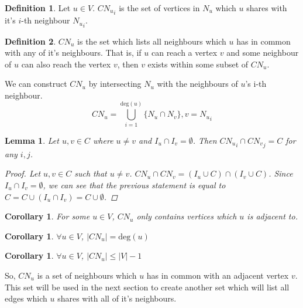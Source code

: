 \documentclass{article}
\theoremstyle{plain}
\newtheorem{lem}[thm]{Lemma}
\newtheorem{cor}[thm]{Corollary}
\theoremstyle{definition}
\newtheorem{defn}{Definition}[]
\theoremstyle{remark}
\newcommand{\cn}[1]{ {{CN}_{#1}} }
\newcommand{\vdeg}[1]{ {\text{deg}({#1})} }
\newcommand{\ignv}[1]{ {I_{#1}} }
\newcommand{\nev}[1]{ {N_{#1}} }
\begin{document}
\begin{defn}
    Let \(u \in V\). \(\cn{u}_i\) is the set of vertices in \(\nev{u}\) which \(u\) shares
    with it's \(i\)-th neighbour \(\nev{u}_i\).
\end{defn}

\begin{defn}
    \(\cn{u}\) is the set which lists all neighbours which \(u\) has in common with any of
    it's neighbours. That is, if \(u\) can reach a vertex \(v\) and some neighbour of
    \(u\) can also reach the vertex \(v\), then \(v\) exists within some subset of
    \(\cn{u}\).
\end{defn}

We can construct \(\cn{u}\) by intersecting \(\nev{u}\) with the neighbours of \(u\)'s
i-th neighbour.
\begin{equation}
    \cn{u} = \bigcup_{i=1}^{\vdeg{u}} \{ \nev{u} \cap \nev{v} \}, v = {\nev{u}}_i
    \label{cn_construct}
\end{equation}

\begin{lem}
    Let \(u, v \in C\) where \(u \neq v\) and \(\ignv{u} \cap \ignv{v} = \emptyset\). Then
    \(\cn{u}_i \cap \cn{v}_j = C\) for any \(i, j\).
    \label{cn_no_common}
    \begin{proof}
        Let \(u, v \in C\) such that \(u \neq v\).
        \(\cn{u} \cap \cn{v} = (\ignv{u} \cup C) \cap (\ignv{v} \cup C)\). Since
        \(\ignv{u} \cap \ignv{v} = \emptyset\), we can see that the previous statement is
        equal to \(C = C \cup (\ignv{u} \cap \ignv{v}) = C \cup \emptyset\).
    \end{proof}
\end{lem}

\begin{cor}
    For some \(u \in V\), \(\cn{u}\) only contains vertices which \(u\) is adjacent to.
    \label{cn_exclusive_neighbours}
\end{cor}

\begin{cor}
    \(\forall u \in V\), \(|\cn{u}| = \vdeg{u}\)
\end{cor}
\begin{cor}
    \(\forall u \in V\), \(|\cn{u}| \leq |V| - 1\)
    \label{max_cn}
\end{cor}

So, \(\cn{u}\) is a set of neighbours which \(u\) has in common with an adjacent vertex
\(v\). This set will be used in the next section to create another set which will list all
edges which \(u\) shares with all of it's neighbours.
\end{document}
